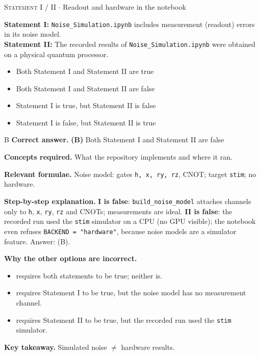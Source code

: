 \documentclass[11pt,a4paper]{article}
\newcommand{\optlabel}[1]{\textbf{(#1)}}
\newcommand{\correctlabel}[1]{\textcolor{okgreen}{\textbf{(#1)}\,\ding{51}}}
\newenvironment{qitem}[1]{\begin{list}{}{\setlength{\leftmargin}{3.3em}\setlength{\labelwidth}{3.1em}%
  \setlength{\labelsep}{0.2em}\setlength{\topsep}{3pt}\setlength{\parsep}{3pt}}\item[\textbf{Q.#1}\hfill]}{\end{list}}
\newcommand{\qsep}{\par\vspace{2pt}{\color{black!15}\hrule}\vspace{4pt}}
\newcommand{\qmeta}[2]{{\footnotesize\color{black!60}\textsc{#1} \;$\cdot$\; #2}\par}
\begin{document}
\begin{qitem}{78}
\qmeta{Statement I / II}{Readout and hardware in the notebook}
\textbf{Statement I:} \texttt{Noise\_Simulation.ipynb} includes measurement (readout) errors in its noise model.\\[1mm]
\textbf{Statement II:} The recorded results of \texttt{Noise\_Simulation.ipynb} were obtained on a physical quantum processor.
\begin{itemize}[leftmargin=2.6em, labelsep=0.4em, itemsep=2pt, topsep=3pt]
\item[\optlabel{A}] Both Statement I and Statement II are true
\item[\correctlabel{B}] Both Statement I and Statement II are false
\item[\optlabel{C}] Statement I is true, but Statement II is false
\item[\optlabel{D}] Statement I is false, but Statement II is true
\end{itemize}
\end{qitem}
\begin{solbox}{B}
\textbf{\color{brand}Correct answer.} \textcolor{okgreen}{\textbf{(B)}} Both Statement I and Statement II are false

\textbf{\color{brand}Concepts required.} What the repository implements and where it ran.

\textbf{\color{brand}Relevant formulae.} Noise model: gates \texttt{h, x, ry, rz}, CNOT; target \texttt{stim}; no hardware.

\textbf{\color{brand}Step-by-step explanation.} \textbf{I is false}: \texttt{build\_noise\_model} attaches channels only to \texttt{h}, \texttt{x}, \texttt{ry}, \texttt{rz} and CNOTs; measurements are ideal.
\textbf{II is false}: the recorded run used the \texttt{stim} simulator on a CPU (no GPU visible); the notebook even refuses \texttt{BACKEND = "hardware"}, because noise
models are a simulator feature. Answer: (B).

\textbf{\color{brand}Why the other options are incorrect.}
\begin{itemize}[leftmargin=2.4em, itemsep=1pt, topsep=2pt]
\item[\textbf{(A)}] requires both statements to be true; neither is.
\item[\textbf{(C)}] requires Statement I to be true, but the noise model has no measurement channel.
\item[\textbf{(D)}] requires Statement II to be true, but the recorded run used the \texttt{stim} simulator.
\end{itemize}
\textbf{\color{brand}Key takeaway.} Simulated noise $\neq$ hardware results.
\end{solbox}
\qsep
\end{document}

